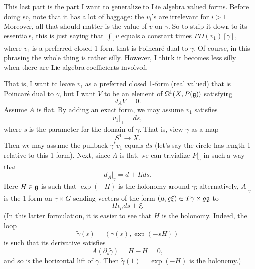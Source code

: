 \documentclass{article}
\newcommand{\intd}[1]{\displaystyle \int_{#1}}
\begin{document}
This last part is the part I want to generalize to Lie algebra valued forms. Before doing so, note that it has a lot of baggage: the $v_i$'s are irrelevant for $i > 1$. Moreover, all that should matter is the value of $v$ on $\gamma$. So to strip it down to its essentials, this is just saying that $\intd{\gamma} v$ equals a constant times $PD(v_1)\left[ \gamma \right]$, where $v_1$ is a preferred closed 1-form that is Poincar\'{e} dual to $\gamma$. Of course, in this phrasing the whole thing is rather silly. However, I think it becomes less silly when there are Lie algebra coefficients involved. 

That is, I want to leave $v_1$ as a preferred closed 1-form (real valued) that is Poincar\'{e} dual to $\gamma$, but I want $V$ to be an element of $\Omega^1(X, P(\frak{g}))$ satisfying 
$$d_A V = 0.$$
Assume $A$ is flat. By adding an exact form, we may assume $v_1$ satisfies
$$v_1 \vert_{\gamma} = d s,$$
where $s$ is the parameter for the domain of $\gamma$. That is, view $\gamma$ as a map
$$S^1 \longrightarrow X.$$
Then we may assume the pullback $\gamma^* v_1$ equals $d s$ (let's say the circle has length 1 relative to this 1-form). Next, since $A$ is flat, we can trivialize $P \vert_{\gamma}$ in such a way that
$$d_A\vert_{\gamma} = d + H d s.$$
Here $H \in \frak{g}$ is such that $\exp(-H)$ is the holonomy around $\gamma$; alternatively, $A\vert_\gamma$ is the 1-form on $\gamma \times G$ sending vectors of the form $(\mu, g \xi ) \in T\gamma \times g \frak{g}$ to
$$H \iota_\mu d s + \xi.$$
(In this latter formulation, it is easier to see that $H$ is the holonomy. Indeed, the loop
$$\widetilde{\gamma}(s) = (\gamma(s),  \exp(-sH))$$
is such that its derivative satisfies
$$A( \partial_s \widetilde{\gamma} ) = H  - H= 0,$$
and so is the horizontal lift of $\gamma$. Then $\widetilde{\gamma}(1) = \exp(-H)$ is the holonomy.)
\end{document}
